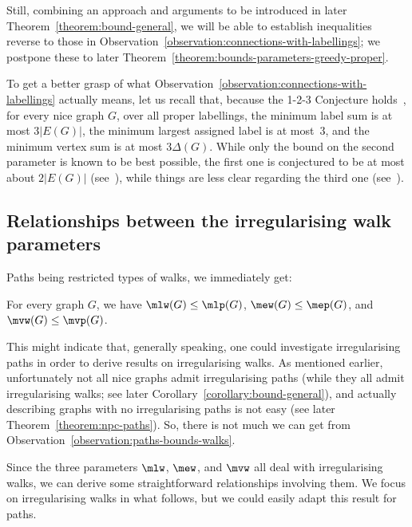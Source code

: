 \documentclass[a4paper,11pt,dvipsnames]{elsarticle}
\begin{document}
Still, combining an approach and arguments to be introduced in later Theorem~\ref{theorem:bound-general}, we will be able to establish inequalities reverse to those in Observation~\ref{observation:connections-with-labellings}; we postpone these to later Theorem~\ref{theorem:bounds-parameters-greedy-proper}.

To get a better grasp of what Observation~\ref{observation:connections-with-labellings} actually means, 
let us recall that, because the 1-2-3 Conjecture holds~\cite{Keu24},
for every nice graph $G$, over all proper labellings, the minimum label sum is at most $3|E(G)|$,
the minimum largest assigned label is at most~$3$,
and the minimum vertex sum is at most $3\Delta(G)$.
While only the bound on the second parameter is known to be best possible,
the first one is conjectured to be at most about $2|E(G)|$ (see~\cite{BFN22}),
while things are less clear regarding the third one (see~\cite{BLLN21}).

\subsection{Relationships between the irregularising walk parameters}

Paths being restricted types of walks, we immediately get:

\begin{observation}\label{observation:paths-bounds-walks}
For every graph $G$,
we have $\mlw(G) \leq \mlp(G)$, $\mew(G) \leq \mep(G)$, and $\mvw(G) \leq \mvp(G)$.
\end{observation}

\noindent This might indicate that, generally speaking, one could investigate irregularising paths in order to derive results on irregularising walks.
As mentioned earlier, unfortunately not all nice graphs admit irregularising paths (while they all admit irregularising walks; see later Corollary~\ref{corollary:bound-general}),
and actually describing graphs with no irregularising paths is not easy (see later Theorem~\ref{theorem:npc-paths}).
So, there is not much we can get from Observation~\ref{observation:paths-bounds-walks}.

Since the three parameters $\mlw$, $\mew$, and $\mvw$ all deal with irregularising walks, we can derive some straightforward relationships involving them. We focus on irregularising walks in what follows, but we could easily adapt this result for paths.
\end{document}

